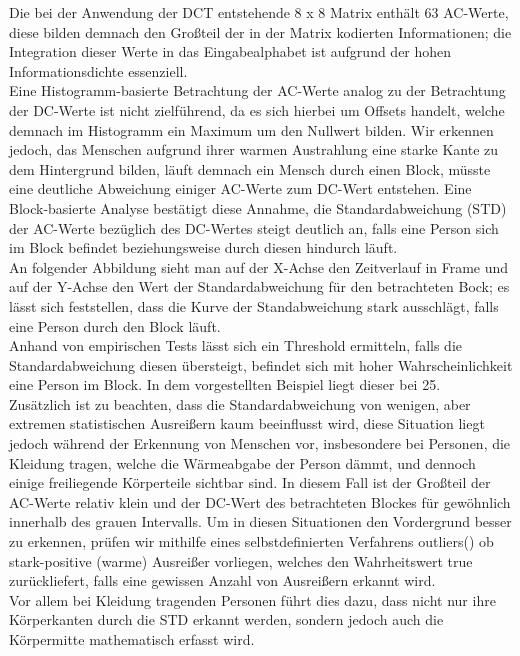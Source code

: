 Die bei der Anwendung der DCT entstehende 8 x 8 Matrix enthält 63 AC-Werte, diese bilden demnach den Großteil der in der Matrix kodierten Informationen; die Integration dieser Werte in das Eingabealphabet ist aufgrund der hohen Informationsdichte essenziell.\\
Eine Histogramm-basierte Betrachtung der AC-Werte analog zu der Betrachtung der DC-Werte ist nicht zielführend, da es sich hierbei um Offsets handelt, welche demnach im Histogramm ein Maximum um den Nullwert bilden.
Wir erkennen jedoch, das Menschen aufgrund ihrer warmen Austrahlung eine starke Kante zu dem Hintergrund bilden, läuft demnach ein Mensch durch einen Block, müsste eine deutliche Abweichung einiger AC-Werte zum DC-Wert entstehen.
Eine Block-basierte Analyse bestätigt diese Annahme, die Standardabweichung (STD) der AC-Werte bezüglich des DC-Wertes steigt deutlich an, falls eine Person sich im Block befindet beziehungsweise durch diesen hindurch läuft.\\
An folgender Abbildung sieht man auf der X-Achse den Zeitverlauf in Frame und auf der Y-Achse den Wert der Standardabweichung für den betrachteten Bock; es lässt sich feststellen, dass die Kurve der Standabweichung stark ausschlägt, falls eine Person durch den Block läuft.\\
Anhand von empirischen Tests lässt sich ein Threshold ermitteln, falls die Standardabweichung diesen übersteigt, befindet sich mit hoher Wahrscheinlichkeit eine Person im Block.
In dem vorgestellten Beispiel liegt dieser bei 25.\\
Zusätzlich ist zu beachten, dass die Standardabweichung von wenigen, aber extremen statistischen Ausreißern kaum beeinflusst wird, diese Situation liegt  jedoch während der Erkennung von Menschen vor, insbesondere bei Personen, die Kleidung tragen, welche die Wärmeabgabe der Person dämmt, und dennoch einige freiliegende Körperteile sichtbar sind.
In diesem Fall ist der Großteil der AC-Werte relativ klein und der DC-Wert des betrachteten Blockes für gewöhnlich innerhalb des grauen Intervalls.
Um in diesen Situationen den Vordergrund besser zu erkennen, prüfen wir mithilfe eines selbstdefinierten Verfahrens outliers() ob stark-positive (warme) Ausreißer vorliegen, welches den Wahrheitswert true zurückliefert, falls eine gewissen Anzahl von Ausreißern erkannt wird.\\
Vor allem bei Kleidung tragenden Personen führt dies dazu, dass nicht nur ihre Körperkanten durch die STD erkannt werden, sondern jedoch auch die Körpermitte mathematisch erfasst wird.\\
